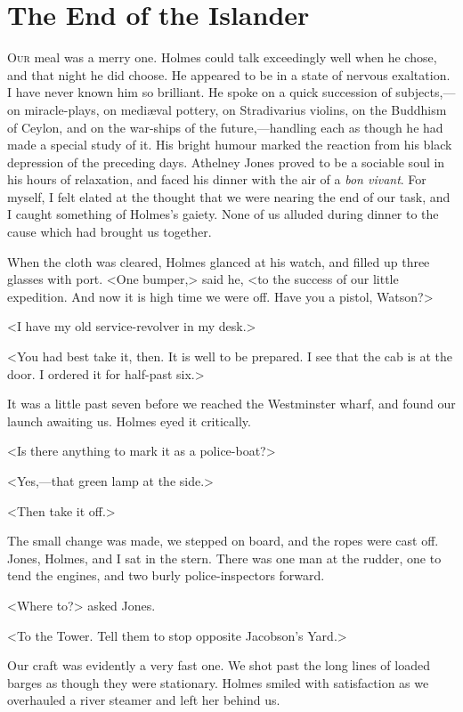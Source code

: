 \chapter{The End of the Islander}
\lettrine{O}{ur} meal was a merry one. Holmes could talk exceedingly well when he chose, and that night he did choose. He appeared to be in a state of nervous exaltation. I have never known him so brilliant. He spoke on a quick succession of subjects,—on miracle-plays, on mediæval pottery, on Stradivarius violins, on the Buddhism of Ceylon, and on the war-ships of the future,—handling each as though he had made a special study of it. His bright humour marked the reaction from his black depression of the preceding days. Athelney Jones proved to be a sociable soul in his hours of relaxation, and faced his dinner with the air of a \textit{bon vivant}. For myself, I felt elated at the thought that we were nearing the end of our task, and I caught something of Holmes's gaiety. None of us alluded during dinner to the cause which had brought us together.

When the cloth was cleared, Holmes glanced at his watch, and filled up three glasses with port. <One bumper,> said he, <to the success of our little expedition. And now it is high time we were off. Have you a pistol, Watson?>

<I have my old service-revolver in my desk.>

<You had best take it, then. It is well to be prepared. I see that the cab is at the door. I ordered it for half-past six.>

It was a little past seven before we reached the Westminster wharf, and found our launch awaiting us. Holmes eyed it critically.

<Is there anything to mark it as a police-boat?>

<Yes,—that green lamp at the side.>

<Then take it off.>

The small change was made, we stepped on board, and the ropes were cast off. Jones, Holmes, and I sat in the stern. There was one man at the rudder, one to tend the engines, and two burly police-inspectors forward.

<Where to?> asked Jones.

<To the Tower. Tell them to stop opposite Jacobson's Yard.>

Our craft was evidently a very fast one. We shot past the long lines of loaded barges as though they were stationary. Holmes smiled with satisfaction as we overhauled a river steamer and left her behind us.

